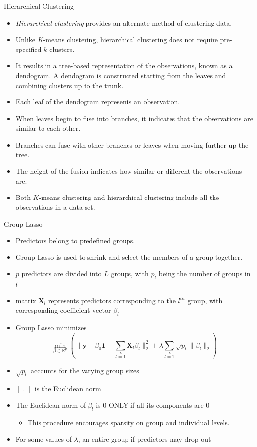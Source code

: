 \documentclass[8pt]{beamer}
\begin{document}
\begin{frame}{Hierarchical Clustering}
\begin{itemize}
    \item \emph{Hierarchical clustering} provides an alternate method of clustering data. 
    \item Unlike $K$-means clustering, hierarchical clustering does not require pre-specified $k$ clusters.
    \item It results in a tree-based representation of the observations, known as a dendogram. A dendogram is constructed starting from the leaves and combining clusters up to the trunk. 
    \item Each leaf of the dendogram represents an observation. 
    \item When leaves begin to fuse into branches, it indicates that the observations are similar to each other. 
    \item Branches can fuse with other branches or leaves when moving further up the tree. 
    \item The height of the fusion indicates how similar or different the observations are. 
    \item Both $K$-means clustering and hierarchical clustering include all the observations in a data set.     
\end{itemize}   
\end{frame}

\begin{frame}{Group Lasso}

\begin{itemize}
    \item Predictors belong to predefined groups. 
    \item Group Lasso is used to shrink and select the members of a group together. 
    \item $p$ predictors are divided into $L$ groups, with $p_{l}$ being the number of groups in $l$
    \item matrix $\mathbf{X}_{l}$ represents predictors corresponding to the $l^{th}$ group, with corresponding coefficient vector $\beta_{l}$
    \item Group Lasso minimizes
    \[
    \min\limits_{\beta \in \mathbb{R}^{p}}
    (\|\mathbf{y}-\beta_{0}\mathbf{1}-\sum\limits_{l=1}\limits^{L}
    \mathbf{X}_{l}\beta_{l} \|_{2}^{2} + 
    \lambda \sum\limits_{l=1}\limits^{L} \sqrt{p_l} \|\beta_{l}\|_{2})
    \]
    \item $\sqrt{p_{l}}$ accounts for the varying group sizes 
    \item $\|.\|$ is the Euclidean norm 
    \item The Euclidean norm of $\beta_{l}$ is $0$ ONLY if all its components are $0$
        \begin{itemize}
            \item This procedure encourages sparsity on group and individual levels.
        \end{itemize}
    \item For some values of $\lambda$, an entire group if predictors may drop out
\end{itemize}

    
\end{frame}
\end{document}
